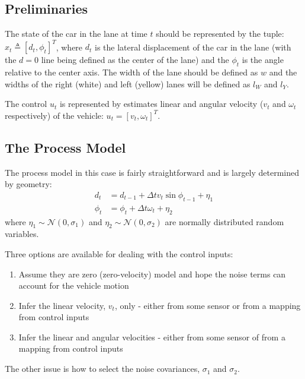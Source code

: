 \documentclass[12pt]{article}
\begin{document}
\subsection{Preliminaries}
The state of the car in the lane at time $t$ should be represented by the tuple: $x_t \triangleq [d_t,\phi_t]^T$, where $d_t$ is the lateral displacement of the car in the lane (with the $d=0$ line being defined as the center of the lane) and the $\phi_t$ is the angle relative to the center axis. The width of the lane should be defined as $w$ and the widths of the right (white) and left (yellow) lanes will be defined as $l_W$ and $l_Y$.

The control $u_t$ is represented by estimates linear and angular velocity ($v_t$ and $\omega_t$ respectively) of the vehicle: $u_t=[v_t,\omega_t]^T$.

\subsection{The Process Model}

The process model in this case is fairly straightforward and is largely determined by geometry:
\begin{equation}
\begin{split}
d_t&=d_{t-1}+\Delta{t}v_t\sin{\phi_{t-1}} + \eta_1 \\
\phi_t&=\phi_t + \Delta{t}\omega_t + \eta_2
\end{split}
\label{eq:process_model}
\end{equation}
where $\eta_1 \sim \mathcal{N}(0,\sigma_1)$ and $\eta_2 \sim \mathcal{N}(0,\sigma_2)$ are normally distributed random variables.

Three options are available for dealing with the control inputs:
\begin{enumerate}
\item Assume they are zero (zero-velocity) model and hope the noise terms can account for the vehicle motion
\item Infer the linear velocity, $v_t$, only - either from some sensor or from a mapping from control inputs
\item Infer the linear and angular velocities - either from some sensor of from a mapping from control inputs
\end{enumerate}

The other issue is how to select the noise covariances, $\sigma_1$ and $\sigma_2$.
\end{document}
